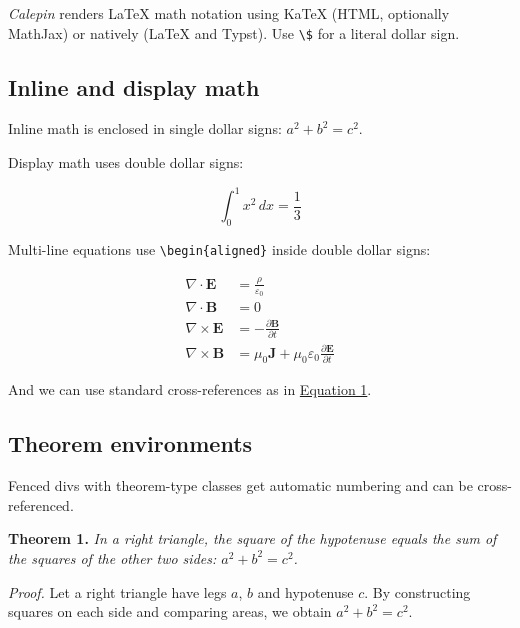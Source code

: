 \emph{Calepin} renders LaTeX math notation using KaTeX (HTML, optionally MathJax) or natively (LaTeX and Typst). Use \texttt{\textbackslash{}\$} for a literal dollar sign.

\subsection*{Inline and display math}
\label{inline-and-display-math}

Inline math is enclosed in single dollar signs: $a^2 + b^2 = c^2$.

Display math uses double dollar signs:

$$
\int_0^1 x^2 \, dx = \frac{1}{3}
$$

Multi-line equations use \texttt{\textbackslash{}begin\{aligned\}} inside double dollar signs:

\begin{equation}
\begin{aligned}
\nabla \cdot \mathbf{E} &= \frac{\rho}{\varepsilon_0} \\
\nabla \cdot \mathbf{B} &= 0 \\
\nabla \times \mathbf{E} &= -\frac{\partial \mathbf{B}}{\partial t} \\
\nabla \times \mathbf{B} &= \mu_0 \mathbf{J} + \mu_0 \varepsilon_0 \frac{\partial \mathbf{E}}{\partial t}
\end{aligned}
\label{eq-hello}
\end{equation}

And we can use standard cross-references as in \hyperref[eq-hello]{Equation 1}.

\subsection*{Theorem environments}
\label{theorem-environments}

Fenced divs with theorem-type classes get automatic numbering and can be cross-referenced.



\par\medskip\noindent\textbf{Theorem 1.}\label{thm-pythagoras} \itshape{} In a right triangle, the square of the hypotenuse equals the sum of the squares of the other two sides: $a^2 + b^2 = c^2$.

\upshape\medskip

\par\medskip\noindent\textit{ Proof.} Let a right triangle have legs $a$, $b$ and hypotenuse $c$. By constructing squares on each side and comparing areas, we obtain $a^2 + b^2 = c^2$.

